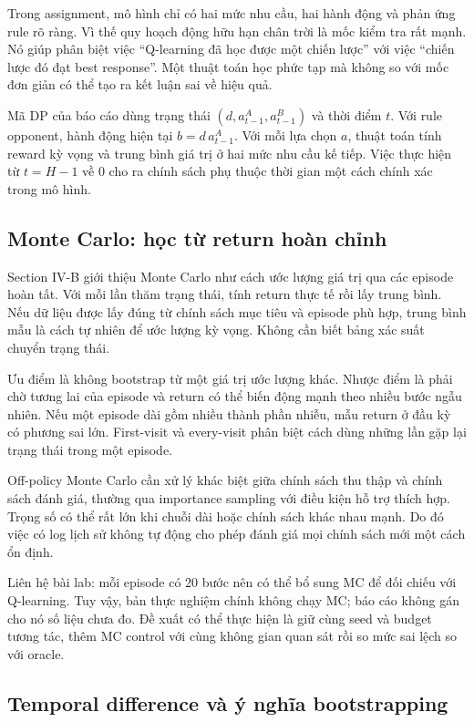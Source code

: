 Trong assignment, mô hình chỉ có hai mức nhu cầu, hai hành động và phản
ứng rule rõ ràng. Vì thế quy hoạch động hữu hạn chân trời là mốc kiểm
tra rất mạnh. Nó giúp phân biệt việc ``Q-learning đã học được một chiến
lược'' với việc ``chiến lược đó đạt best response''. Một thuật toán học
phức tạp mà không so với mốc đơn giản có thể tạo ra kết luận sai về hiệu
quả.

Mã DP của báo cáo dùng trạng thái \((d,a_{t-1}^{A},a_{t-1}^{B})\) và
thời điểm \(t\). Với rule opponent, hành động hiện tại
\(b=d\,a_{t-1}^{A}\). Với mỗi lựa chọn \(a\), thuật toán tính reward kỳ
vọng và trung bình giá trị ở hai mức nhu cầu kế tiếp. Việc thực hiện từ
\(t=H-1\) về 0 cho ra chính sách phụ thuộc thời gian một cách chính xác
trong mô hình.

\subsection{Monte Carlo: học từ return hoàn
chỉnh}\label{monte-carlo-hux1ecdc-tux1eeb-return-houxe0n-chux1ec9nh}

Section IV-B giới thiệu Monte Carlo như cách ước lượng giá trị qua các
episode hoàn tất. Với mỗi lần thăm trạng thái, tính return thực tế rồi
lấy trung bình. Nếu dữ liệu được lấy đúng từ chính sách mục tiêu và
episode phù hợp, trung bình mẫu là cách tự nhiên để ước lượng kỳ vọng.
Không cần biết bảng xác suất chuyển trạng thái.

Ưu điểm là không bootstrap từ một giá trị ước lượng khác. Nhược điểm là
phải chờ tương lai của episode và return có thể biến động mạnh theo
nhiều bước ngẫu nhiên. Nếu một episode dài gồm nhiều thành phần nhiễu,
mẫu return ở đầu kỳ có phương sai lớn. First-visit và every-visit phân
biệt cách dùng những lần gặp lại trạng thái trong một episode.

Off-policy Monte Carlo cần xử lý khác biệt giữa chính sách thu thập và
chính sách đánh giá, thường qua importance sampling với điều kiện hỗ trợ
thích hợp. Trọng số có thể rất lớn khi chuỗi dài hoặc chính sách khác
nhau mạnh. Do đó việc có log lịch sử không tự động cho phép đánh giá mọi
chính sách mới một cách ổn định.

Liên hệ bài lab: mỗi episode có 20 bước nên có thể bổ sung MC để đối
chiếu với Q-learning. Tuy vậy, bản thực nghiệm chính không chạy MC; báo
cáo không gán cho nó số liệu chưa đo. Đề xuất có thể thực hiện là giữ
cùng seed và budget tương tác, thêm MC control với cùng không gian quan
sát rồi so mức sai lệch so với oracle.

\subsection{Temporal difference và ý nghĩa
bootstrapping}\label{temporal-difference-vuxe0-uxfd-nghux129a-bootstrapping}

